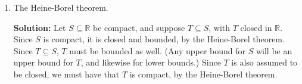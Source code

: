 \documentclass[letterpaper,12pt]{article}
\newcommand{\R}{\mathbb{R}}
\begin{document}
\begin{enumerate}
\begin{enumerate}
{\bf Solution:} We will use the same argument obtained during our class discussion: Let $S\subseteq \R$ be compact, and suppose $T\subseteq S$, with $T$ closed in $\R$. Let $\{G_\alpha\}_{\alpha\in I}$ be an open cover of $T$, for some index set $I$. We need to show that there are finitely many $\alpha_1,\ldots, \alpha_k\in I$ such that
\[
 T\subseteq G_{\alpha_1}\cup\cdots \cup G_{\alpha_k}.
\]
Since $T$ is closed, $\R\setminus T$ is open. Since $T\cup (\R\setminus T)=\R$ and $T\subseteq \bigcup G_{\alpha}$, it follows that $S\subseteq \left(\bigcup G_\alpha\right)\cup (R\setminus T)$, so that $\{G_\alpha\}_{\alpha\in I}\cup\{\R\setminus T\}$ is an open cover of $S$. Since $S$ is compact, this open cover must admit a finite subcover. Thus, we have
\[
 S\subseteq G_{\alpha_1}\cup \cdots G_{\alpha_k}\cup (\R\setminus T)
\]
for some $\alpha_1,\ldots, \alpha_k\in I$. Since $T\cap (\R\setminus T)=\emptyset$, we must have $T\subseteq G_{\alpha_1}\cup\cdots \cup G_{\alpha_k}$, which is what we needed to show.

 \item The Heine-Borel theorem.

\bigskip

{\bf Solution:} Let $S\subseteq \R$ be compact, and suppose $T\subseteq S$, with $T$ closed in $\R$. Since $S$ is compact, it is closed and bounded, by the Heine-Borel theorem. Since $T\subseteq S$, $T$ must be bounded as well. (Any upper bound for $S$ will be an upper bound for $T$, and likewise for lower bounds.) Since $T$ is also assumed to be closed, we must have that $T$ is compact, by the Heine-Borel theorem.
\end{enumerate}



\end{enumerate}
\end{document}
